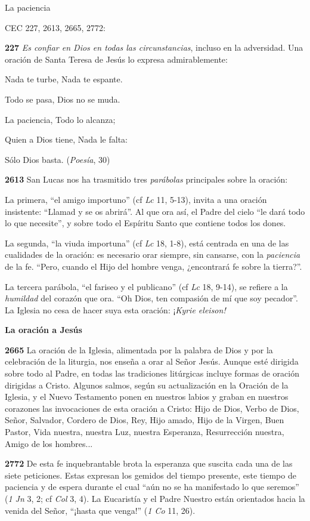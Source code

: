 \documentclass[]{article}
\begin{document}
La paciencia

CEC 227, 2613, 2665, 2772:

\textbf{227} \emph{Es confiar en Dios en todas las circunstancias},
incluso en la adversidad. Una oración de Santa Teresa de Jesús lo
expresa admirablemente:

Nada te turbe, Nada te espante.

Todo se pasa, Dios no se muda.

La paciencia, Todo lo alcanza;

Quien a Dios tiene, Nada le falta:

Sólo Dios basta. (\emph{Poesía}, 30)

\textbf{2613} San Lucas nos ha trasmitido tres \emph{parábolas}
principales sobre la oración:

La primera, ``el amigo importuno'' (cf \emph{Lc} 11, 5-13), invita a una
oración insistente: ``Llamad y se os abrirá''. Al que ora así, el Padre
del cielo ``le dará todo lo que necesite'', y sobre todo el Espíritu
Santo que contiene todos los dones.

La segunda, ``la viuda importuna'' (cf \emph{Lc} 18, 1-8), está centrada
en una de las cualidades de la oración: es necesario orar siempre, sin
cansarse, con la \emph{paciencia} de la fe. ``Pero, cuando el Hijo del
hombre venga, ¿encontrará fe sobre la tierra?''.

La tercera parábola, ``el fariseo y el publicano'' (cf \emph{Lc} 18,
9-14), se refiere a la \emph{humildad} del corazón que ora. ``Oh Dios,
ten compasión de mí que soy pecador''. La Iglesia no cesa de hacer suya
esta oración: ¡\emph{Kyrie eleison!}

\textbf{La oración a Jesús}

\textbf{2665} La oración de la Iglesia, alimentada por la palabra de
Dios y por la celebración de la liturgia, nos enseña a orar al Señor
Jesús. Aunque esté dirigida sobre todo al Padre, en todas las
tradiciones litúrgicas incluye formas de oración dirigidas a Cristo.
Algunos salmos, según su actualización en la Oración de la Iglesia, y el
Nuevo Testamento ponen en nuestros labios y graban en nuestros corazones
las invocaciones de esta oración a Cristo: Hijo de Dios, Verbo de Dios,
Señor, Salvador, Cordero de Dios, Rey, Hijo amado, Hijo de la Virgen,
Buen Pastor, Vida nuestra, nuestra Luz, nuestra Esperanza, Resurrección
nuestra, Amigo de los hombres...

\textbf{2772} De esta fe inquebrantable brota la esperanza que suscita
cada una de las siete peticiones. Estas expresan los gemidos del tiempo
presente, este tiempo de paciencia y de espera durante el cual ``aún no
se ha manifestado lo que seremos'' (\emph{1 Jn} 3, 2; cf \emph{Col} 3,
4). La Eucaristía y el Padre Nuestro están orientados hacia la venida
del Señor, ``¡hasta que venga!'' (\emph{1 Co} 11, 26).
\end{document}
